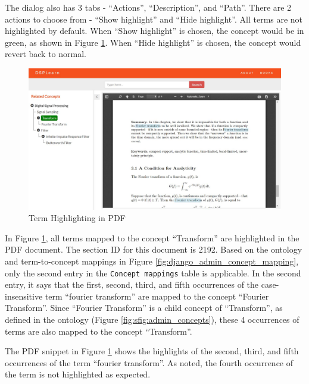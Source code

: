The dialog also has 3 tabs - \enquote{Actions}, \enquote{Description}, and \enquote{Path}. There are 2 actions to choose from - \enquote{Show highlight} and \enquote{Hide highlight}. 
All terms are not highlighted by default. When \enquote{Show highlight} is chosen, the concept would be in green, as shown in Figure \ref{fig:detail_highlight}. When \enquote{Hide highlight} is chosen, the concept would revert back to normal.

\begin{figure}[!htbp]
  \centering
  \includegraphics[width=\textwidth]{system_demonstration/demo_detail_highlight.jpg}
  \caption{Term Highlighting in PDF}
  \label{fig:detail_highlight}
\end{figure}

In Figure \ref{fig:detail_highlight}, all terms mapped to the concept \enquote{Transform} are highlighted in the PDF document. The section ID for this document is 2192. Based on the ontology and term-to-concept mappings in Figure \ref{fig:django_admin_concept_mapping}, only the second entry in the \texttt{Concept mappings} table is applicable. In the second entry, it says that the first, second, third, and fifth occurrences of the case-insensitive term \enquote{fourier transform} are mapped to the concept \enquote{Fourier Transform}. Since \enquote{Fourier Transform} is a child concept of \enquote{Transform}, as defined in the ontology (Figure \ref{fig:sfig:admin_concepts}), these 4 occurrences of terms are also mapped to the concept \enquote{Transform}.

The PDF snippet in Figure \ref{fig:detail_highlight} shows the highlights of the second, third, and fifth occurrences of the term \enquote{fourier transform}. As noted, the fourth occurrence of the term is not highlighted as expected.
